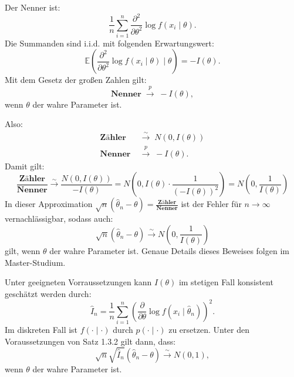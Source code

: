 \documentclass[10pt]{article}
\newcommand{\EW}{\mathbb{E}} %
\newcommand{\KW}{\overset{p} \longrightarrow} %
\newcommand{\KV}{\overset{\sim} \longrightarrow} %
\newcommand{\ablt}{\frac{\partial}{\partial \theta}}
\newenvironment{BWS}[1][]
{\begin{Beweis}[frametitle=#1]}{\end{Beweis}}
\begin{document}
\begin{BWS}[Beweisidee 1.3.6 (Verteilung des Schätzfehlers)]
		Der Nenner ist:
		\begin{equation*}
			\frac{1}{n} \sum_{i=1}^{n} \frac{\partial^2}{\partial \theta^2} \log f(x_i \mid \theta).
		\end{equation*}
		Die Summanden sind i.i.d. mit folgenden Erwartungswert:
		\begin{equation*}
			\EW \left(\frac{\partial^2}{\partial \theta^2} \log f(x_i \mid \theta) \mid \theta \right) = -I(\theta).
		\end{equation*}
		Mit dem Gesetz der großen Zahlen gilt:
		\begin{equation*}
			\textbf{Nenner} \; \KW \; -I(\theta),
		\end{equation*}
		wenn $\theta$ der wahre Parameter ist. 
		
		Also: 
		\begin{equation*}
			\begin{split}
				\textbf{Zähler} \; &\KV \; N(0,I(\theta))\\
				\textbf{Nenner} \; &\KW \; -I(\theta).
			\end{split}
		\end{equation*}
		Damit gilt:
		\begin{equation*}
			\frac{\textbf{Zähler}}{\textbf{Nenner}} \KV \frac{N(0,I(\theta))}{-I(\theta)} = N\left(0, I(\theta) \cdot \frac{1}{(-I(\theta))^2}\right) = N\left(0, \frac{1}{I(\theta)}\right)
		\end{equation*}
		In dieser Approximation $\sqrt{n}(\hat{\theta}_n - \theta) = \frac{\textbf{Zähler}}{\textbf{Nenner}}$ ist der Fehler für $n \rightarrow \infty$ vernachlässigbar, sodass auch:
		\begin{equation*}
			\sqrt{n}(\hat{\theta}_n - \theta)  \KV N\left(0, \frac{1}{I(\theta)}\right)
		\end{equation*}
		gilt, wenn $\theta$ der wahre Parameter ist. Genaue Details dieses Beweises folgen im Master-Studium. 
	\end{BWS}
	Unter geeigneten Vorraussetzungen kann $I(\theta)$ im stetigen Fall konsistent geschätzt werden durch:
	\begin{equation*}
		\hat{I}_n = \frac{1}{n} \sum_{i=1}^{n}\left(\ablt \log f(x_i\mid \hat{\theta}_n)\right)^2.
	\end{equation*}
	Im diskreten Fall ist $f(\cdot \mid \cdot)$ durch $p(\cdot \mid \cdot)$ zu ersetzen.
	Unter den Voraussetzungen von Satz 1.3.2 gilt dann, dass:
	\begin{equation*}
		\sqrt{n} \sqrt{\hat{I}_n}(\hat{\theta}_n - \theta) \KV N(0,1),
	\end{equation*}
	wenn $\theta$ der wahre Parameter ist. 
	
\end{document}
